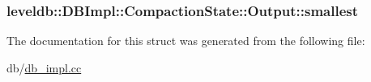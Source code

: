 \subsubsection[{smallest}]{ leveldb\+::\+D\+B\+Impl\+::\+Compaction\+State\+::\+Output\+::smallest}\label{structleveldb_1_1_d_b_impl_1_1_compaction_state_1_1_output_a88ada857d0cf32ae8e76d7baf4e80c69}


The documentation for this struct was generated from the following file\+:\begin{DoxyCompactItemize}
\item 
db/\hyperlink{db__impl_8cc}{db\+\_\+impl.\+cc}\end{DoxyCompactItemize}
